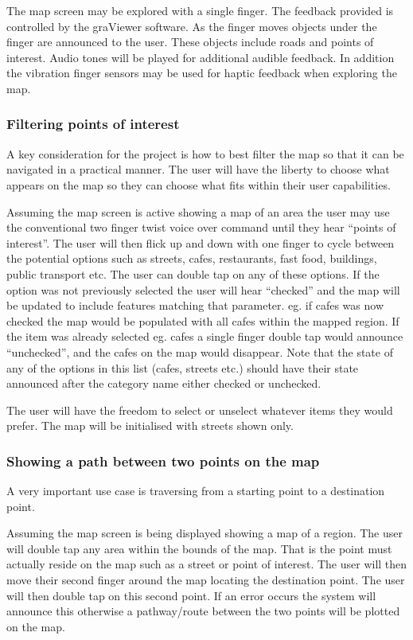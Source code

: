 \documentclass[11pt,twoside,a4paper]{article}
\begin{document}
The map screen may be explored with a single finger. The feedback
provided is controlled by the graViewer software. As the finger moves
objects under the finger are announced to the user. These objects
include roads and points of interest. Audio tones will be played for
additional audible feedback. In addition the vibration finger sensors
may be used for haptic feedback when exploring the map.

\subsubsection{Filtering points of interest}

A key consideration for the project is how to best filter the map so
that it can be navigated in a practical manner. The user will have the
liberty to choose what appears on the map so they can choose what fits
within their user capabilities.

Assuming the map screen is active showing a map of an area the user may
use the conventional two finger twist voice over command until they hear
``points of interest''. The user will then flick up and down with one
finger to cycle between the potential options such as streets, cafes,
restaurants, fast food, buildings, public transport etc. The user can
double tap on any of these options. If the option was not previously
selected the user will hear ``checked'' and the map will be updated to
include features matching that parameter. eg. if cafes was now checked
the map would be populated with all cafes within the mapped region. If
the item was already selected eg. cafes a single finger double tap would
announce ``unchecked'', and the cafes on the map would disappear. Note
that the state of any of the options in this list (cafes, streets etc.)
should have their state announced after the category name either checked
or unchecked. 

The user will have the freedom to select or unselect whatever items they
would prefer. The map will be initialised with streets shown only.

\subsubsection{Showing a path between two points on the map}

A very important use case is traversing from a starting point to a
destination point.

Assuming the map screen is being displayed showing a map of a
region. The user will double tap any area within the bounds of the
map. That is the point must actually reside on the map such as a street
or point of interest. The user will then move their second finger around
the map locating the destination point. The user will then double tap 
on this second point. If an error occurs the system will announce this otherwise a
pathway/route between the two points will be plotted on the map.
\end{document}
